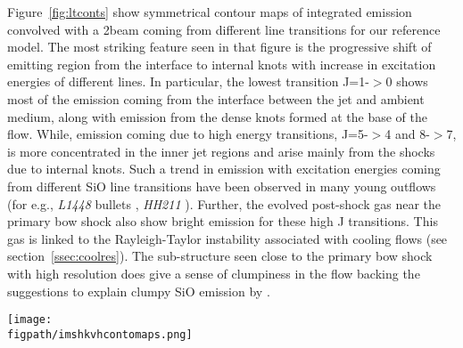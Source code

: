 \documentclass[useAMS,usenatbib,letters]{mn2e}
\newcommand{\figpath}{PFIGS/}
\begin{document}
Figure~\ref{fig:ltconts} show symmetrical contour maps of integrated 
emission convolved with a 2\arcsec beam coming from different line
transitions for our reference model. The most
striking feature seen in that figure is the progressive shift of
emitting region from the interface to internal knots with increase in
excitation energies of different lines. In particular, the lowest
transition J=1-$>$0 shows most of the emission coming from the
interface between the jet and ambient medium, along with emission from
the dense knots formed at the base of the flow. While, emission coming
due to high energy transitions, J=5-$>$4 and 8-$>$7, 
is more concentrated in the inner jet regions and arise mainly from
the shocks due to internal knots. Such a trend in emission with excitation energies coming from different SiO line transitions
have been observed in many young outflows (for e.g., {\it{L1448}}
bullets \citep{Nisini:2007p13128}, {\it{HH211}}
\citep{Chandler:2001p14376, Nisini:2002p14418,
  Hirano:2006p14411}). Further, the evolved post-shock gas near the
primary bow shock also show bright emission for these high J transitions. 
This gas is linked to the Rayleigh-Taylor instability associated with cooling flows (see
section~\ref{ssec:coolres}). The sub-structure seen close to the
primary bow shock with high resolution does give a sense of clumpiness
in the flow backing the suggestions to explain clumpy SiO emission by
\citealt{Chandler:2001p14376}.
%

\begin{figure*}
 \texttt{[image: \\figpath/imshkvhcontomaps.png]}
 \caption{Contours of SiO emission for different line transitions
   obtained for the run with molecular cooling with $\eta$ = 3 using
   the functional form of the SiO fractional abundance with $\delta <$
   1. The contour colors represent different intensities in Kelvins, i.e,
   30.0({\it red}), 10.0({\it green}), 5.0({\it blue}), 1.0({\it
     magenta}), 0.5({\it cyan}), 0.1({\it black}).} 
\label{fig:ltconts}
\end{figure*}
\end{document}
